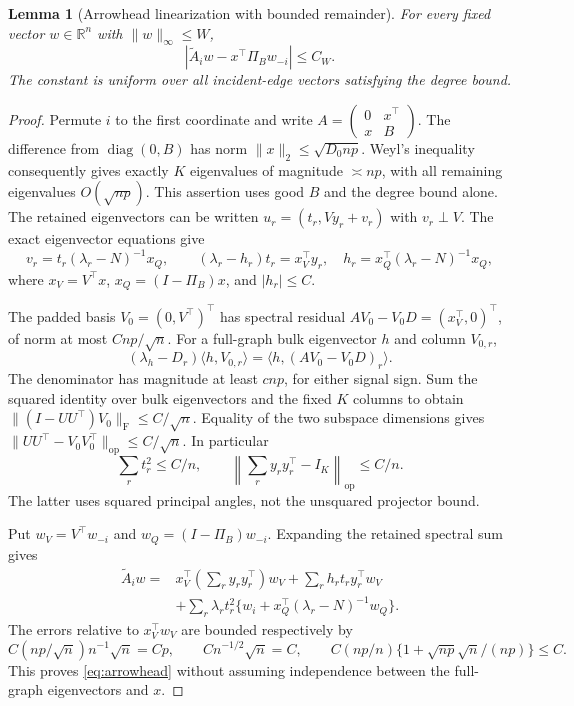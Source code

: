 \documentclass[11pt]{article}
\newtheorem{lemma}[theorem]{Lemma}
\theoremstyle{definition}
\theoremstyle{remark}
\numberwithin{equation}{section}
\begin{document}
\begin{lemma}[Arrowhead linearization with bounded remainder]\label{lem:arrowhead}
For every fixed vector $w\in\mathbb R^n$ with $\|w\|_\infty\le W$,
\begin{equation}\label{eq:arrowhead}
 \left|\widetilde A_iw-x^\top\Pi_B w_{-i}\right|\le C_W.
\end{equation}
The constant is uniform over all incident-edge vectors satisfying the degree bound.
\end{lemma}
\begin{proof}
Permute $i$ to the first coordinate and write $A=\left(\begin{smallmatrix}0&x^\top\\x&B\end{smallmatrix}\right)$. The difference from $\operatorname{diag}(0,B)$ has norm $\|x\|_2\le\sqrt{D_0np}$. Weyl's inequality consequently gives exactly $K$ eigenvalues of magnitude $\asymp np$, with all remaining eigenvalues $O(\sqrt{np})$. This assertion uses good $B$ and the degree bound alone. The retained eigenvectors can be written $u_r=(t_r,Vy_r+v_r)$ with $v_r\perp V$. The exact eigenvector equations give
\[
 v_r=t_r(\lambda_r-N)^{-1}x_Q,\qquad
 (\lambda_r-h_r)t_r=x_V^\top y_r,
 \quad h_r=x_Q^\top(\lambda_r-N)^{-1}x_Q,
\]
where $x_V=V^\top x$, $x_Q=(I-\Pi_B)x$, and $|h_r|\le C$.

The padded basis $V_0=(0,V^\top)^\top$ has spectral residual $AV_0-V_0D=(x_V^\top,0)^\top$, of norm at most $Cnp/\sqrt n$. For a full-graph bulk eigenvector $h$ and column $V_{0,r}$,
\[
 (\lambda_h-D_r)\langle h,V_{0,r}\rangle
 =\langle h,(AV_0-V_0D)_r\rangle.
\]
The denominator has magnitude at least $c np$, for either signal sign. Sum the squared identity over bulk eigenvectors and the fixed $K$ columns to obtain $\|(I-UU^\top)V_0\|_{\mathrm F}\le C/\sqrt n$. Equality of the two subspace dimensions gives $\|UU^\top-V_0V_0^\top\|_{\mathrm{op}}\le C/\sqrt n$. In particular
\[
 \sum_rt_r^2\le C/n,\qquad
 \left\|\sum_ry_ry_r^\top-I_K\right\|_{\mathrm{op}}\le C/n.
\]
The latter uses squared principal angles, not the unsquared projector bound.

Put $w_V=V^\top w_{-i}$ and $w_Q=(I-\Pi_B)w_{-i}$. Expanding the retained spectral sum gives
\begin{align*}
 \widetilde A_iw={}&x_V^\top\left(\sum_ry_ry_r^\top\right)w_V
       +\sum_r h_rt_ry_r^\top w_V\\
 &+\sum_r\lambda_rt_r^2
       \{w_i+x_Q^\top(\lambda_r-N)^{-1}w_Q\}.
\end{align*}
The errors relative to $x_V^\top w_V$ are bounded respectively by
\[
 C(np/\sqrt n)n^{-1}\sqrt n=Cp,\qquad Cn^{-1/2}\sqrt n=C,
 \qquad C(np/n)\{1+\sqrt{np}\sqrt n/(np)\}\le C.
\]
This proves \eqref{eq:arrowhead} without assuming independence between the full-graph eigenvectors and $x$.
\end{proof}
\end{document}
